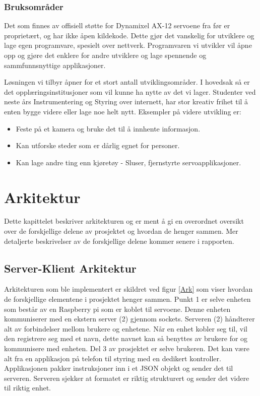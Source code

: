 \documentclass[12pt]{report}
\begin{document}
\subsection{Bruksområder}
Det som finnes av offisiell støtte for Dynamixel AX-12 servoene fra før er proprietært, og har ikke åpen kildekode. Dette gjør det vanskelig for utviklere og lage egen programvare, spesielt over nettverk. Programvaren vi utvikler vil åpne opp og gjøre det enklere for andre utviklere og lage spennende og sammfunnsnyttige applikasjoner. 

Løsningen vi tilbyr åpner for et stort antall utviklingsområder. I hovedsak så er det opplæringsinstitusjoner som vil kunne ha nytte av det vi lager. Studenter ved neste års Instrumentering og Styring over internett, har stor kreativ frihet til å enten bygge videre eller lage noe helt nytt. Eksempler på videre utvikling er:

\begin{itemize}
	\item Feste på et kamera og bruke det til å innhente informasjon.
	\item Kan utforske steder som er dårlig egnet for personer.
	\item Kan lage andre ting enn kjøretøy - Sluser, fjernstyrte servoapplikasjoner.
\end{itemize}

\clearpage

\chapter{Arkitektur}
Dette kapittelet beskriver arkitekturen og er ment å gi en overordnet oversikt over de forskjellige delene av prosjektet og hvordan de henger sammen. Mer detaljerte beskrivelser av de forskjellige delene kommer senere i rapporten.

\section{Server-Klient Arkitektur}
Arkitekturen som ble implementert er skildret ved figur \ref{Ark} som viser hvordan de forskjellige elementene i prosjektet henger sammen. Punkt 1 er selve enheten som består av en Raspberry pi\cite{Raspberry} som er koblet til servoene. Denne enheten kommuniserer med en ekstern server (2) gjennom sockets\cite{Sockets}. Serveren (2) håndterer alt av forbindelser mellom brukere og enhetene. Når en enhet kobler seg til, vil den registrere seg med et navn, dette navnet kan så benyttes av brukere for og kommunisere med enheten. Del 3 av prosjektet er selve brukeren. Det kan være alt fra en applikasjon på telefon til styring med en dedikert kontroller. Applikasjonen pakker instruksjoner inn i et JSON objekt\cite{JSON} og sender det til serveren. Serveren sjekker at formatet er riktig strukturert og sender det videre til riktig enhet.
\end{document}
